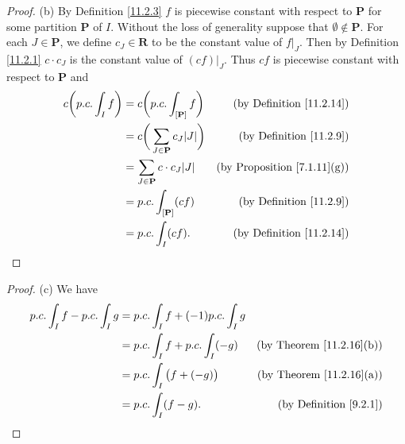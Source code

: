 \begin{proof}{(b)}
    By Definition \ref{11.2.3} \(f\) is piecewise constant with respect to \(\mathbf{P}\) for some partition \(\mathbf{P}\) of \(I\).
    Without the loss of generality suppose that \(\emptyset \notin \mathbf{P}\).
    For each \(J \in \mathbf{P}\), we define \(c_J \in \mathbf{R}\) to be the constant value of \(f|_J\).
    Then by Definition \ref{11.2.1} \(c \cdot c_J\) is the constant value of \((cf)|_J\).
    Thus \(cf\) is piecewise constant with respect to \(\mathbf{P}\) and
    \begin{align*}
        c \bigg(p.c. \int_I f\bigg) & = c \bigg(p.c. \int_{[\mathbf{P}]} f\bigg)           & \text{(by Definition \ref{11.2.14})}    \\
                                    & = c \bigg(\sum_{J \in \mathbf{P}} c_J \abs*{J}\bigg) & \text{(by Definition \ref{11.2.9})}     \\
                                    & = \sum_{J \in \mathbf{P}} c \cdot c_J \abs*{J}       & \text{(by Proposition \ref{7.1.11}(g))} \\
                                    & = p.c. \int_{[\mathbf{P}]} (c f)                     & \text{(by Definition \ref{11.2.9})}     \\
                                    & = p.c. \int_I (c f).                                 & \text{(by Definition \ref{11.2.14})}
    \end{align*}
\end{proof}

\begin{proof}{(c)}
    We have
    \begin{align*}
        p.c. \int_I f - p.c. \int_I g & = p.c. \int_I f + (-1) p.c. \int_I g                                        \\
                                      & = p.c. \int_I f + p.c. \int_I (-g)   & \text{(by Theorem \ref{11.2.16}(b))} \\
                                      & = p.c. \int_I \big(f + (-g)\big)     & \text{(by Theorem \ref{11.2.16}(a))} \\
                                      & = p.c. \int_I (f - g).               & \text{(by Definition \ref{9.2.1})}
    \end{align*}
\end{proof}

